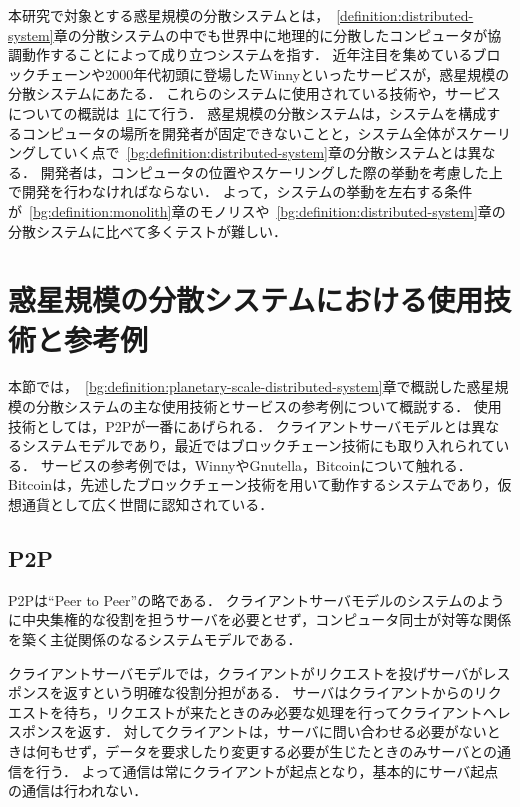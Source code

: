 本研究で対象とする惑星規模の分散システムとは，~\ref{definition:distributed-system}章の分散システムの中でも世界中に地理的に分散したコンピュータが協調動作することによって成り立つシステムを指す．
近年注目を集めているブロックチェーンや2000年代初頭に登場したWinnyといったサービスが，惑星規模の分散システムにあたる．
これらのシステムに使用されている技術や，サービスについての概説は~\ref{bg:planetary-scale-distributed-system}にて行う．
惑星規模の分散システムは，システムを構成するコンピュータの場所を開発者が固定できないことと，システム全体がスケーリングしていく点で~\ref{bg:definition:distributed-system}章の分散システムとは異なる．
開発者は，コンピュータの位置やスケーリングした際の挙動を考慮した上で開発を行わなければならない．
よって，システムの挙動を左右する条件が~\ref{bg:definition:monolith}章のモノリスや~\ref{bg:definition:distributed-system}章の分散システムに比べて多くテストが難しい．

\section{惑星規模の分散システムにおける使用技術と参考例}
\label{bg:planetary-scale-distributed-system}

本節では，~\ref{bg:definition:planetary-scale-distributed-system}章で概説した惑星規模の分散システムの主な使用技術とサービスの参考例について概説する．
使用技術としては，P2Pが一番にあげられる．
クライアントサーバモデルとは異なるシステムモデルであり，最近ではブロックチェーン技術にも取り入れられている．
サービスの参考例では，WinnyやGnutella，Bitcoinについて触れる．
Bitcoinは，先述したブロックチェーン技術を用いて動作するシステムであり，仮想通貨として広く世間に認知されている．

\subsection{P2P}
\label{bg:planetary-scale-distributed-system:p2p}

P2Pは``Peer to Peer''の略である．
クライアントサーバモデルのシステムのように中央集権的な役割を担うサーバを必要とせず，コンピュータ同士が対等な関係を築く主従関係のなるシステムモデルである．

クライアントサーバモデルでは，クライアントがリクエストを投げサーバがレスポンスを返すという明確な役割分担がある．
サーバはクライアントからのリクエストを待ち，リクエストが来たときのみ必要な処理を行ってクライアントへレスポンスを返す．
対してクライアントは，サーバに問い合わせる必要がないときは何もせず，データを要求したり変更する必要が生じたときのみサーバとの通信を行う．
よって通信は常にクライアントが起点となり，基本的にサーバ起点の通信は行われない．

